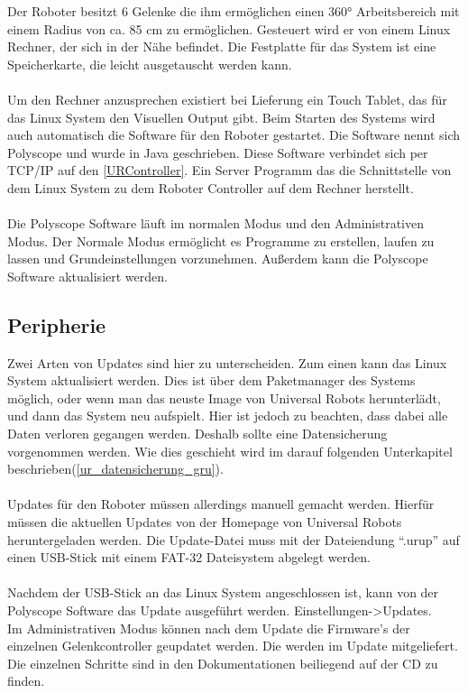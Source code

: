 Der Roboter besitzt 6 Gelenke die ihm ermöglichen einen 360° Arbeitsbereich mit einem Radius von ca. 85 cm zu ermöglichen. Gesteuert wird er von einem Linux Rechner, der sich in der Nähe befindet.
Die Festplatte für das System ist eine Speicherkarte, die leicht ausgetauscht werden kann.
\\\\
Um den Rechner anzusprechen existiert bei Lieferung ein Touch Tablet, das für das Linux System den Visuellen Output gibt. Beim Starten des Systems wird auch automatisch die Software für den Roboter gestartet. Die Software nennt sich Polyscope und wurde in Java geschrieben. Diese Software verbindet sich per TCP/IP auf den \ref{URController}. Ein Server Programm das die Schnittstelle von dem Linux System zu dem Roboter Controller auf dem Rechner herstellt.
\\\\
Die Polyscope Software läuft im normalen Modus und den Administrativen Modus. Der Normale Modus ermöglicht es Programme zu erstellen, laufen zu lassen und Grundeinstellungen vorzunehmen. Außerdem kann die Polyscope Software aktualisiert werden.

\subsection{Peripherie}
\label{sub:ur_update_gru}

Zwei Arten von Updates sind hier zu unterscheiden. Zum einen kann das Linux System aktualisiert werden. Dies ist über dem Paketmanager des Systems möglich, oder wenn man das neuste Image von Universal Robots herunterlädt, und dann das System neu aufspielt. Hier ist jedoch zu beachten, dass dabei alle Daten verloren gegangen werden. Deshalb sollte eine Datensicherung vorgenommen werden. Wie dies geschieht wird im darauf folgenden Unterkapitel beschrieben(\ref{ur_datensicherung_gru}).
\\\\
Updates für den Roboter müssen allerdings manuell gemacht werden. Hierfür müssen die aktuellen Updates von der Homepage von Universal Robots heruntergeladen werden. Die Update-Datei muss mit der Dateiendung ``.urup'' auf einen USB-Stick mit einem FAT-32 Dateisystem abgelegt werden.\\\\
Nachdem der USB-Stick an das Linux System angeschlossen ist, kann von der Polyscope Software das Update ausgeführt werden. Einstellungen->Updates.\\
Im Administrativen Modus können nach dem Update die Firmware's der einzelnen Gelenkcontroller geupdatet werden. Die werden im Update mitgeliefert. Die einzelnen Schritte sind in den Dokumentationen beiliegend auf der CD zu finden.

